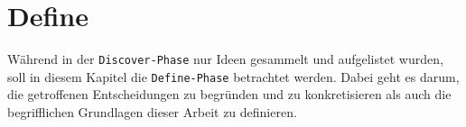 \section{Define}
\label{sec:define}
  Während in der \texttt{Discover-Phase} nur Ideen gesammelt und aufgelistet wurden, soll in diesem Kapitel die \texttt{Define-Phase} betrachtet werden. Dabei geht es darum, die getroffenen Entscheidungen zu begründen und zu konkretisieren als auch die begrifflichen Grundlagen dieser Arbeit zu definieren.
  
  
  
  
  
  
  
